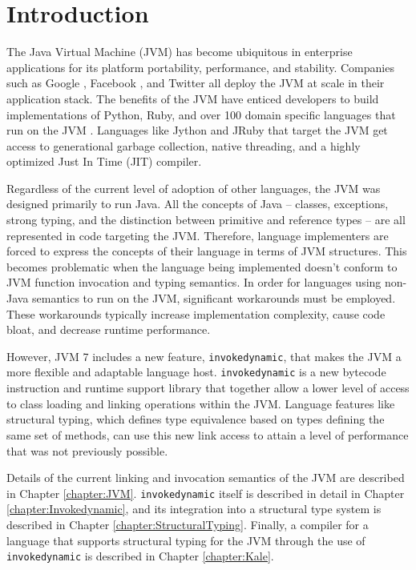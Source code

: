 \chapter{Introduction}
\label{Intro}
\lhead{ \leftmark }

The Java Virtual Machine (JVM) has become ubiquitous in enterprise applications for its platform portability, performance, and stability.  Companies such as Google \cite{google-jvm}, Facebook \cite{facebook-hbase}, and Twitter \cite{java-at-twitter} all deploy the JVM at scale in their application stack.  The benefits of the JVM have enticed developers to build implementations of Python, Ruby, and over 100 domain specific languages that run on the JVM \cite{jvm-lang-summit}.  Languages like Jython and JRuby that target the JVM get access to generational garbage collection, native threading, and a highly optimized Just In Time (JIT) compiler.  

Regardless of the current level of adoption of other languages, the JVM was designed primarily to run Java.  All the concepts of Java -- classes, exceptions, strong typing, and the distinction between primitive and reference types -- are all represented in code targeting the JVM.  Therefore, language implementers are forced to express the concepts of their language in terms of JVM structures.  This becomes problematic when the language being implemented doesn't conform to JVM function invocation and typing semantics.  In order for languages using non-Java semantics to run on the JVM, significant workarounds must be employed.  These workarounds typically increase implementation complexity, cause code bloat, and decrease runtime performance.

However, JVM 7 includes a new feature, \texttt{invokedynamic}, that makes the JVM a more flexible and adaptable language host.  \texttt{invokedynamic} is a new bytecode instruction and runtime support library that together allow a lower level of access to class loading and linking operations within the JVM.  Language features like structural typing, which defines type equivalence based on types defining the same set of methods, can use this new link access to attain a level of performance that was not previously possible.

Details of the current linking and invocation semantics of the JVM are described in Chapter \ref{chapter:JVM}.  \texttt{invokedynamic} itself is described in detail in Chapter \ref{chapter:Invokedynamic}, and its integration into a structural type system is described in Chapter \ref{chapter:StructuralTyping}.  Finally, a compiler for a language that supports structural typing for the JVM through the use of \texttt{invokedynamic} is described in Chapter \ref{chapter:Kale}.


